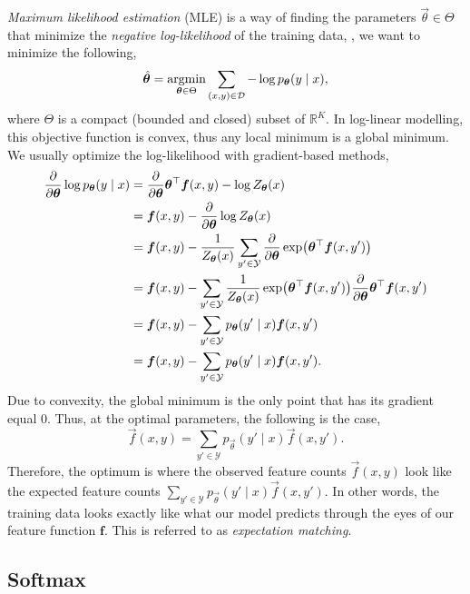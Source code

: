\textit{Maximum likelihood estimation} (MLE) is a way of finding the parameters
$\vec{\theta}\in\Theta$ that minimize the \textit{negative log-likelihood} of
the training data, \ie, we want to minimize the following, \[
  \hat{\bm{\theta}} = \operatorname*{argmin}_{\bm{\theta}\in\Theta} \sum_{(x,y)\in\mathcal{D}} -\log p_{\bm{\theta}}(y\mid x)
,\]
where $\Theta$ is a compact (bounded and closed) subset of
$\mathbb{R}^K$.
In log-linear modelling, this objective function is convex, thus any local
minimum is a global minimum. We usually optimize the log-likelihood with
gradient-based methods,
\begin{align*}
  \pdv*{\log p_{\vec{\theta}}(y \mid x)}{\vec{\theta}} &= \pdv*{\transpose{\vec{\theta}} \vec{f}(x,y) - \log Z_{\vec{\theta}}}{\vec{\theta}}(x) \\
  &= \vec{f}(x,y) - \pdv*{\log Z_{\vec{\theta}}}{\vec{\theta}}(x) \\
  &= \vec{f}(x,y) - \frac{1}{Z_{\vec{\theta}}(x)} \sum_{y'\in\mathcal{Y}} \pdv*{\exp \lft( \transpose{\vec{\theta}} \vec{f}(x,y') \rgt) }{\vec{\theta}} \\
  &= \vec{f}(x,y) - \sum_{y'\in\mathcal{Y}} \frac{1}{Z_{\vec{\theta}}(x)} \exp \lft( \transpose{\vec{\theta}} \vec{f}(x,y') \rgt) \pdv*{\transpose{\vec{\theta}} \vec{f}(x,y')}{\vec{\theta}} \\
  &= \vec{f}(x,y) - \sum_{y'\in\mathcal{Y}} p_{\vec{\theta}}(y'\mid x) \vec{f}(x,y') \\
  &= \vec{f}(x,y) - \sum_{y'\in\mathcal{Y}} p_{\vec{\theta}}(y'\mid x) \vec{f}(x,y')
.\end{align*}
Due to convexity, the global minimum is the only point that has its gradient
equal $0$. Thus, at the optimal parameters, the following is the case, \[
  \vec{f}(x,y) = \sum_{y'\in\mathcal{Y}}p_{\vec{\theta}}(y'\mid x)\vec{f}(x,y')
.\]
Therefore, the optimum is where the observed feature counts $\vec{f}(x,y)$ look
like the expected feature counts
$\sum_{y'\in\mathcal{Y}}p_{\vec{\theta}}(y'\mid x)\vec{f}(x,y')$. In other
words, the training data looks exactly like what our model predicts through the
eyes of our feature function $\bm{f}$. This is referred to as
\textit{expectation matching}.

\subsection{Softmax}

